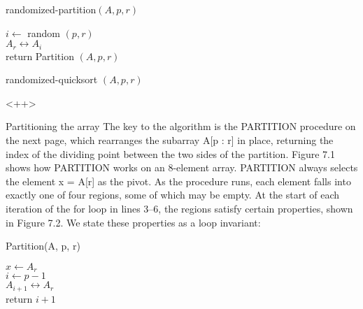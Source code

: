 \begin{algbox}{randomized-partition$(A, p, r)$}
  \begin{algorithm}[H]
      $i \leftarrow $ random $(p, r)$ \\
      $A_{r} \leftrightarrow A_{i} $ \\
      return Partition $(A, p, r)$
    \end{algorithm}
\end{algbox}


    \begin{algbox}{randomized-quicksort $(A, p, r)$}
      \begin{algorithm}
      \end{algorithm}
    \end{algbox}<++>

Partitioning the array
The key to the algorithm is the PARTITION procedure on the next page, which rearranges the subarray A[p : r] in place, returning the index of the dividing point between the two sides of the partition.
Figure 7.1 shows how PARTITION works on an 8-element array. PARTITION always selects the element x = A[r] as the pivot. As the procedure runs, each element falls into exactly one of four regions, some of which may be empty. At the start of each iteration of the for loop in lines 3–6, the regions satisfy certain properties, shown in Figure 7.2. We state these properties as a loop invariant:


\begin{algbox}{Partition(A, p, r)}
  \begin{algorithm}
    $ x \leftarrow A_{r} $ \\
    $ i \leftarrow p - 1 $ \\
   $ A_{i+1} \leftrightarrow A_{r} $\\
   return $ i+1$
  \end{algorithm}
\end{algbox}

